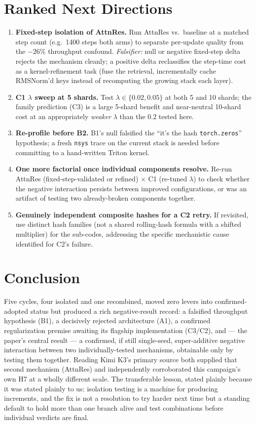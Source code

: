 \documentclass{article}
\begin{document}
\section{Ranked Next Directions}
\begin{enumerate}
\item \textbf{Fixed-step isolation of AttnRes.} Run AttnRes vs.\ baseline at a matched step count (e.g.\ 1400 steps both arms) to separate per-update quality from the $-26\%$ throughput confound. \emph{Falsifier:} null or negative fixed-step delta rejects the mechanism cleanly; a positive delta reclassifies the step-time cost as a kernel-refinement task (fuse the retrieval, incrementally cache RMSNorm'd keys instead of recomputing the growing stack each layer).
\item \textbf{C1 $\lambda$ sweep at 5 shards.} Test $\lambda\in\{0.02,0.05\}$ at both 5 and 10 shards; the family prediction (C3) is a large 5-shard benefit and near-neutral 10-shard cost at an appropriately \emph{weaker} $\lambda$ than the $0.2$ tested here.
\item \textbf{Re-profile before B2.} B1's null falsified the ``it's the hash \texttt{torch.zeros}'' hypothesis; a fresh \texttt{nsys} trace on the current stack is needed before committing to a hand-written Triton kernel.
\item \textbf{One more factorial once individual components resolve.} Re-run AttnRes (fixed-step-validated or refined) $\times$ C1 (re-tuned $\lambda$) to check whether the negative interaction persists between improved configurations, or was an artifact of testing two already-broken components together.
\item \textbf{Genuinely independent composite hashes for a C2 retry.} If revisited, use distinct hash families (not a shared rolling-hash formula with a shifted multiplier) for the sub-codes, addressing the specific mechanistic cause identified for C2's failure.
\end{enumerate}

\section{Conclusion}
Five cycles, four isolated and one recombined, moved zero levers into confirmed-adopted status but produced a rich negative-result record: a falsified throughput hypothesis (B1), a decisively rejected architecture (A1), a confirmed regularization premise awaiting its flagship implementation (C3/C2), and --- the paper's central result --- a confirmed, if still single-seed, super-additive negative interaction between two individually-tested mechanisms, obtainable only by testing them together. Reading Kimi K3's primary source both supplied that second mechanism (AttnRes) and independently corroborated this campaign's own H7 at a wholly different scale. The transferable lesson, stated plainly because it was stated plainly to us: isolation testing is a machine for producing increments, and the fix is not a resolution to try harder next time but a standing default to hold more than one branch alive and test combinations before individual verdicts are final.
\end{document}
